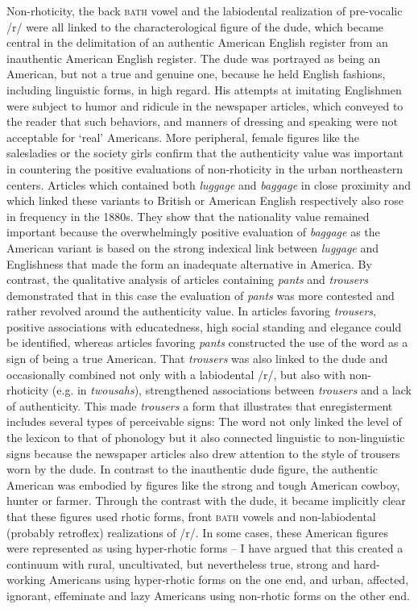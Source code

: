 Non-rhoticity, the back \textsc{bath} vowel and the labiodental realization of pre-vocalic /r/ were all linked to the characterological figure of the dude, which became central in the delimitation of an authentic American English register from an inauthentic American English register. The dude was portrayed as being an American, but not a true and genuine one, because he held English fashions, including linguistic forms, in high regard. His attempts at imitating Englishmen were subject to humor and ridicule in the newspaper articles, which conveyed to the reader that such behaviors, and manners of dressing and speaking were not acceptable for ‘real’ Americans. More peripheral, female figures like the salesladies or the society girls confirm that the authenticity value was important in countering the positive evaluations of non-rhoticity in the urban northeastern centers. Articles which contained both \emph{luggage} and \emph{baggage} in close proximity and which linked these variants to British or American English respectively also rose in frequency in the 1880s. They show that the nationality value remained important because the overwhelmingly positive evaluation of \emph{baggage} as the American variant is based on the strong indexical link between \emph{luggage} and Englishness that made the form an inadequate alternative in America. By contrast, the qualitative analysis of articles containing \emph{pants} and \emph{trousers} demonstrated that in this case the evaluation of \emph{pants} was more contested and rather revolved around the authenticity value. In articles favoring \emph{trousers}, positive associations with educatedness, high social standing and elegance could be identified, whereas articles favoring \emph{pants} constructed the use of the word as a sign of being a true American. That \emph{trousers} was also linked to the dude and occasionally combined not only with a labiodental /r/, but also with non-rhoticity (e.g. in \emph{twousahs}), strengthened associations between \emph{trousers} and a lack of authenticity. This made \emph{trousers} a form that illustrates that enregisterment includes several types of perceivable signs: The word not only linked the level of the lexicon to that of phonology but it also connected linguistic to non-linguistic signs because the newspaper articles also drew attention to the style of trousers worn by the dude. In contrast to the inauthentic dude figure, the authentic American was embodied by figures like the strong and tough American cowboy, hunter or farmer. Through the contrast with the dude, it became implicitly clear that these figures used rhotic forms, front \textsc{bath} vowels and non-labiodental (probably retroflex) realizations of /r/. In some cases, these American figures were represented as using hyper-rhotic forms – I have argued that this created a continuum with rural, uncultivated, but nevertheless true, strong and hard-working Americans using hyper-rhotic forms on the one end, and urban, affected, ignorant, effeminate and lazy Americans using non-rhotic forms on the other end.

